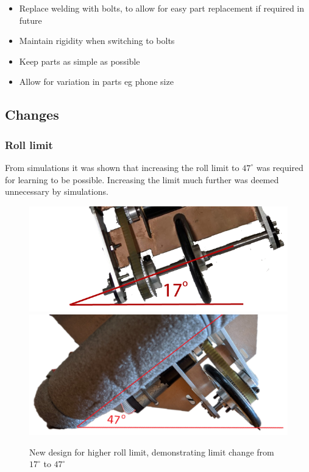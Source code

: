 \documentclass[twoside,twocolumn,12pt]{article}
\begin{document}
\begin{itemize}
\item Replace welding with bolts, to allow for easy part replacement if required in future
\item Maintain rigidity when switching to bolts
\item Keep parts as simple as possible
\item Allow for variation in parts eg phone size
\end{itemize}

\subsection{Changes}
\subsubsection{Roll limit}
From simulations it was shown that increasing the roll limit to $47^{\circ}$ was required for learning to be possible. Increasing the limit much further was deemed unnecessary by simulations.

\begin{figure}
  \centering
    \includegraphics[width=\linewidth]{tiltold}
    \includegraphics[width=\linewidth]{tiltnew2}
  \caption{New design for higher roll limit, demonstrating limit change from $17^{\circ}$ to $47^{\circ}$} 
  \label{fig:newline}
\end{figure}
\end{document}
